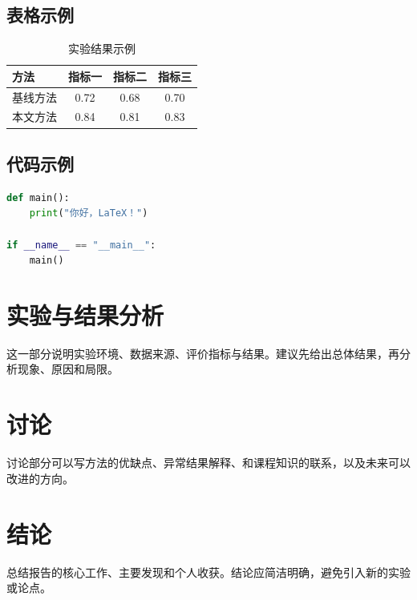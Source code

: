 \documentclass[UTF8,fontset=none,zihao=-4,a4paper]{ctexart}
\begin{document}
\subsection{表格示例}

\begin{table}[htbp]
  \centering
  \caption{实验结果示例}
  \label{tab:results}
  \begin{tabular}{lccc}
    \toprule
    方法 & 指标一 & 指标二 & 指标三 \\
    \midrule
    基线方法 & 0.72 & 0.68 & 0.70 \\
    本文方法 & 0.84 & 0.81 & 0.83 \\
    \bottomrule
  \end{tabular}
\end{table}

\subsection{代码示例}

\begin{lstlisting}[language=Python, caption={Python 代码示例}]
def main():
    print("你好，LaTeX！")

if __name__ == "__main__":
    main()
\end{lstlisting}

\section{实验与结果分析}

这一部分说明实验环境、数据来源、评价指标与结果。建议先给出总体结果，再分析现象、原因和局限。

\section{讨论}

讨论部分可以写方法的优缺点、异常结果解释、和课程知识的联系，以及未来可以改进的方向。

\section{结论}

总结报告的核心工作、主要发现和个人收获。结论应简洁明确，避免引入新的实验或论点。



\end{document}
